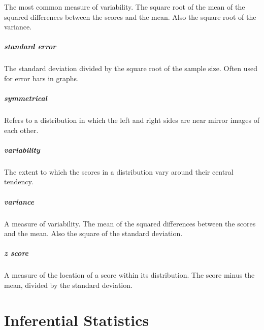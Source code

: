 \documentclass[
]{krantz}
\begin{document}
The most common measure of variability. The square root of the mean of the squared differences between the scores and the mean. Also the square root of the variance.

\paragraph*{standard error}\label{standard-error}

The standard deviation divided by the square root of the sample size. Often used for error bars in graphs.

\paragraph*{symmetrical}\label{symmetrical}

Refers to a distribution in which the left and right sides are near mirror images of each other.

\paragraph*{variability}\label{variability}

The extent to which the scores in a distribution vary around their central tendency.

\paragraph*{variance}\label{variance}

A measure of variability. The mean of the squared differences between the scores and the mean. Also the square of the standard deviation.

\paragraph*{\texorpdfstring{\emph{z} score}{z score}}\label{z-score}

A measure of the location of a score within its distribution. The score minus the mean, divided by the standard deviation.

\chapter{Inferential Statistics}\label{inferential-statistics}
\end{document}

